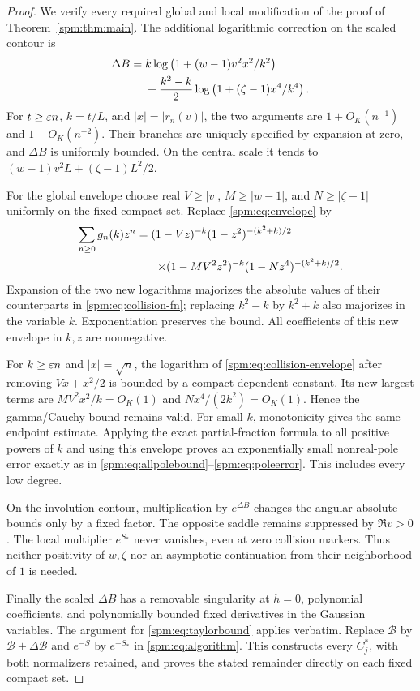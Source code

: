 \begin{proof}
We verify every required global and local modification of the proof of Theorem~\ref{spm:thm:main}. The additional logarithmic correction on the scaled contour is
\begin{align}\label{spm:eq:deltaB}
 \Delta B={}&k\log\left(1+(w-1)v^2x^2/k^2\right)\notag\\
 &+\frac{k^2-k}{2}\log\left(1+(\zeta-1)x^4/k^4\right).
\end{align}
For $t\geq\varepsilon n$, $k=t/L$, and $|x|=|r_n(v)|$, the two arguments are $1+O_K(n^{-1})$ and $1+O_K(n^{-2})$. Their branches are uniquely specified by expansion at zero, and $\Delta B$ is uniformly bounded. On the central scale it tends to
$(w-1)v^2L+(\zeta-1)L^2/2$.

For the global envelope choose real $V\geq|v|$, $M\geq|w-1|$, and $N\geq|\zeta-1|$ uniformly on the fixed compact set. Replace \eqref{spm:eq:envelope} by
\begin{align}\label{spm:eq:collision-envelope}
 \sum_{n\geq0}g_n(k)z^n={}&(1-Vz)^{-k}(1-z^2)^{-(k^2+k)/2}\notag\\
 &\mathrel{}\times(1-MV^2z^2)^{-k}
 (1-Nz^4)^{-(k^2+k)/2}.
\end{align}
Expansion of the two new logarithms majorizes the absolute values of their counterparts in \eqref{spm:eq:collision-fn}; replacing $k^2-k$ by $k^2+k$ also majorizes in the variable $k$. Exponentiation preserves the bound. All coefficients of this new envelope in $k,z$ are nonnegative.

For $k\geq\varepsilon n$ and $|x|=\sqrt n$, the logarithm of \eqref{spm:eq:collision-envelope} after removing $Vx+x^2/2$ is bounded by a compact-dependent constant. Its new largest terms are $MV^2x^2/k=O_K(1)$ and $Nx^4/(2k^2)=O_K(1)$. Hence the gamma/Cauchy bound remains valid. For small $k$, monotonicity gives the same endpoint estimate. Applying the exact partial-fraction formula to all positive powers of $k$ and using this envelope proves an exponentially small nonreal-pole error exactly as in \eqref{spm:eq:allpolebound}--\eqref{spm:eq:poleerror}. This includes every low degree.

On the involution contour, multiplication by $e^{\Delta B}$ changes the angular absolute bounds only by a fixed factor. The opposite saddle remains suppressed by $\Re v>0$. The local multiplier $e^{S_*}$ never vanishes, even at zero collision markers. Thus neither positivity of $w,\zeta$ nor an asymptotic continuation from their neighborhood of $1$ is needed.

Finally the scaled $\Delta B$ has a removable singularity at $h=0$, polynomial coefficients, and polynomially bounded fixed derivatives in the Gaussian variables. The argument for \eqref{spm:eq:taylorbound} applies verbatim. Replace $\mathcal B$ by $\mathcal B+\Delta\mathcal B$ and $e^{-S}$ by $e^{-S_*}$ in \eqref{spm:eq:algorithm}. This constructs every $C_j^*$, with both normalizers retained, and proves the stated remainder directly on each fixed compact set.
\end{proof}

